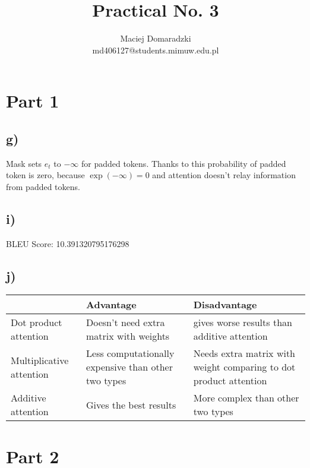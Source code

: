 \documentclass[12pt]{article}
\begin{document}
 
 
\title{Practical No. 3}%
\author{Maciej Domaradzki\\ %
md406127@students.mimuw.edu.pl}
 
\maketitle
 
\section{Part 1 }
\subsection*{g) }
Mask sets $e_t$ to $-\infty$ for padded tokens. Thanks to this probability of padded token is zero, because $\exp(-\infty) = 0$ and attention doesn't relay information from padded tokens.

\subsection*{i) }
BLEU Score: 10.391320795176298

\subsection*{j) }
\begin{tabular}{|| p{3 cm} || p{3 cm} | p{3 cm} ||} 
 \hline
  & Advantage & Disadvantage \\ 
 \hline\hline
 Dot product attention & Doesn't need extra matrix with weights & gives worse results than additive attention\\ 
 \hline
 Multiplicative attention & Less computationally expensive than other two types & Needs extra matrix with weight comparing to dot product attention\\
 \hline
 Additive attention & Gives the best results & More complex than other two types\\
 \hline
\end{tabular}

\section{Part 2 }
\end{document}

